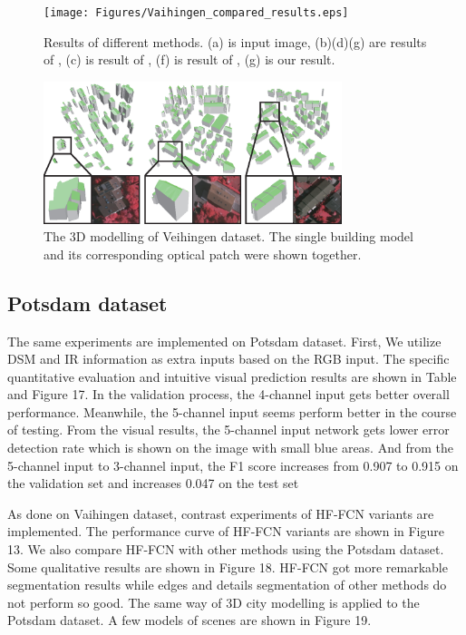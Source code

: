 \begin{figure}
\centering
\texttt{[image: Figures/Vaihingen\_compared\_results.eps]}
\caption{Results of different methods. (a) is input image, (b)(d)(g) are results of \cite{IEEEexample:audebert2017deep}, (c) is result of \cite{IEEEexample:marmanis2016semantic}, (f) is result of \cite{IEEEexample:unknown}, (g) is our result.}
\label{15}
\end{figure}

\begin{figure}
\centering
\includegraphics[width=8.7cm]{Figures/Vaihigen_3Dmodelling.eps}
\caption{The 3D modelling of Veihingen dataset. The single building model and its corresponding optical patch were shown together.}
\label{16}
\end{figure}



\subsection{Potsdam dataset}
 The same experiments are implemented on Potsdam dataset. First, We utilize DSM and IR information as extra inputs based on the RGB input. The specific quantitative evaluation and intuitive visual prediction results are shown in Table and Figure 17. In the validation process, the 4-channel input gets better overall performance. Meanwhile, the 5-channel input seems perform better in the course of testing. From the visual results, the 5-channel input network gets lower error detection rate which is shown on the image with small blue areas. And from the 5-channel input to 3-channel input, the F1 score increases from 0.907 to 0.915 on the validation set and increases 0.047 on the test set \par
 \setlength{\parindent}{2ex} As done on Vaihingen dataset, contrast experiments of HF-FCN variants are implemented. The performance curve of HF-FCN variants are shown in Figure 13. We also compare HF-FCN with other methods using the Potsdam dataset. Some qualitative results are shown in Figure 18. HF-FCN got more remarkable segmentation results while edges and details segmentation of other methods do not perform so good. The same way of 3D city modelling is applied to the Potsdam dataset. A few models of scenes are shown in Figure 19.

